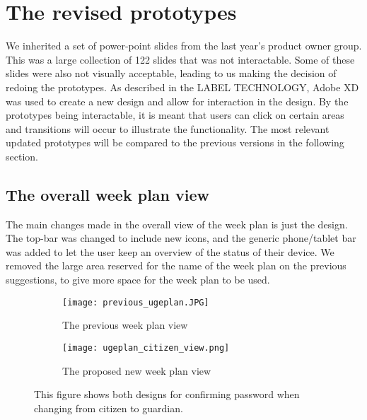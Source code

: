 \section{The revised prototypes}
We inherited a set of power-point slides from the last year's product owner group.
This was a large collection of 122 slides that was not interactable. 
Some of these slides were also not visually acceptable, leading to us making the decision of redoing the prototypes.
As described in the LABEL TECHNOLOGY, Adobe XD was used to create a new design and allow for interaction in the design.
By the prototypes being interactable, it is meant that users can click on certain areas and transitions will occur to illustrate the functionality.
The most relevant updated prototypes will be compared to the previous versions in the following section.

\subsection{The overall week plan view}
The main changes made in the overall view of the week plan is just the design. 
The top-bar was changed to include new icons, and the generic phone/tablet bar was added to let the user keep an overview of the status of their device.
We removed the large area reserved for the name of the week plan on the previous suggestions, to give more space for the week plan to be used. 
\begin{figure}[H]
    \begin{subfigure}{0.5\textwidth}
    \texttt{[image: previous\_ugeplan.JPG]} 
    \caption{The previous week plan view}
    \label{fig:previous_weekplan_view}
    \end{subfigure}
    \begin{subfigure}{0.5\textwidth}
        \texttt{[image: ugeplan\_citizen\_view.png]}
    \caption{The proposed new week plan view}
    \label{fig:new_weekplan_view}
    \end{subfigure} 
    \caption{This figure shows both designs for confirming password when changing from citizen to guardian.}
    \label{fig:weekplan_view}
\end{figure}

